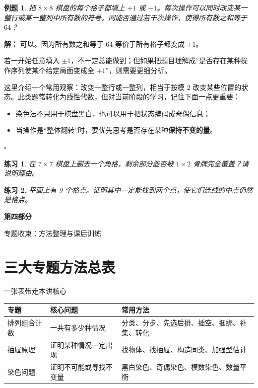 \documentclass[11pt,a4paper,fontset=fandol]{ctexart}
\theoremstyle{formaltheorem}
\theoremstyle{formalexample}
\newtheorem{example}{例题}[section]
\newtheorem{exercise}{练习}[section]
\newenvironment{solution}{\par\noindent\textbf{解：}}{\hfill$\square$\par}
\newcommand{\partdivider}[2]{%
  \clearpage
  \thispagestyle{empty}
  \vspace*{\fill}
  \begin{center}
  \begin{tcolorbox}[
    enhanced,
    width=0.78\textwidth,
    colback=lightblue,
    colframe=mainblue,
    boxrule=0.9pt,
    arc=0mm,
    left=6mm,
    right=6mm,
    top=8mm,
    bottom=8mm
  ]
  \centering
  {\fontsize{24}{30}\selectfont\bfseries #1\par}
  \vspace{0.6cm}
  {\large #2\par}
  \end{tcolorbox}
  \end{center}
  \vspace*{\fill}
  \clearpage
}
\begin{document}
\begin{example}
把 $8\times 8$ 棋盘的每个格子都填上 $+1$ 或 $-1$。每次操作可以同时改变某一整行或某一整列中所有数的符号。问能否通过若干次操作，使得所有数之和等于 $64$？
\end{example}

\begin{solution}
可以。因为所有数之和等于 64 等价于所有格子都变成 $+1$。

若一开始任意填入 $\pm 1$，不一定总能做到；但如果把题目理解成“是否存在某种操作序列使某个给定局面变成全 $+1$”，则需要更细分析。

这里介绍一个常用观察：改变一整行或一整列，相当于按模 2 改变某些位置的状态。此类题常转化为线性代数，但对当前阶段的学习，记住下面一点更重要：
\begin{itemize}
  \item 染色法不只用于棋盘黑白，也可以用于把状态编码成奇偶信息；
  \item 当操作是“整体翻转”时，要优先思考是否存在某种\textbf{保持不变的量}。
\end{itemize}
\end{solution}

\begin{exercise}
在 $7\times 7$ 棋盘上删去一个角格，剩余部分能否被 $1\times 2$ 骨牌完全覆盖？请说明理由。
\end{exercise}

\begin{exercise}
平面上有 9 个格点。证明其中一定能找到两个点，使它们连线的中点仍然是格点。
\end{exercise}

\partdivider{第四部分}{专题收束：方法整理与课后训练}

\section{三大专题方法总表}

\begin{goalbox}{一张表带走本讲核心}
\begin{center}
\renewcommand{\arraystretch}{1.45}
\begin{tabular}{|p{3cm}|p{4.3cm}|p{5.4cm}|}
\hline
\textbf{专题} & \textbf{核心问题} & \textbf{常用方法} \\
\hline
排列组合计数 & 一共有多少种情况 & 分类、分步、先选后排、插空、捆绑、补集、转化 \\
\hline
抽屉原理 & 证明某种情况一定出现 & 找物体、找抽屉、构造同类、加强型估计 \\
\hline
染色问题 & 证明不可能或寻找不变量 & 黑白染色、奇偶染色、模数染色、数量平衡 \\
\hline
\end{tabular}
\end{center}
\end{goalbox}
\end{document}
